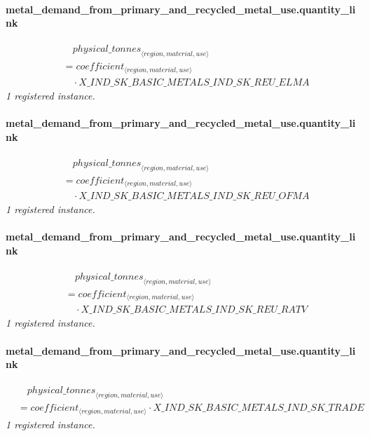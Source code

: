 \documentclass[11pt]{article}
\begin{document}
\paragraph{metal\_demand\_from\_primary\_and\_recycled\_metal\_use.quantity\_link}
\begin{align*}
&\quad {physical\_tonnes}_{\langle region, material, use\rangle}\\
&= coefficient_{\langle region, material, use\rangle}\\
&\quad {}\cdot X\_IND\_SK\_BASIC\_METALS\_IND\_SK\_REU\_ELMA
\end{align*}
\noindent\emph{1 registered instance.}\par
\paragraph{metal\_demand\_from\_primary\_and\_recycled\_metal\_use.quantity\_link}
\begin{align*}
&\quad {physical\_tonnes}_{\langle region, material, use\rangle}\\
&= coefficient_{\langle region, material, use\rangle}\\
&\quad {}\cdot X\_IND\_SK\_BASIC\_METALS\_IND\_SK\_REU\_OFMA
\end{align*}
\noindent\emph{1 registered instance.}\par
\paragraph{metal\_demand\_from\_primary\_and\_recycled\_metal\_use.quantity\_link}
\begin{align*}
&\quad {physical\_tonnes}_{\langle region, material, use\rangle}\\
&= coefficient_{\langle region, material, use\rangle}\\
&\quad {}\cdot X\_IND\_SK\_BASIC\_METALS\_IND\_SK\_REU\_RATV
\end{align*}
\noindent\emph{1 registered instance.}\par
\paragraph{metal\_demand\_from\_primary\_and\_recycled\_metal\_use.quantity\_link}
\begin{align*}
&\quad {physical\_tonnes}_{\langle region, material, use\rangle}\\
&= coefficient_{\langle region, material, use\rangle} \cdot X\_IND\_SK\_BASIC\_METALS\_IND\_SK\_TRADE
\end{align*}
\noindent\emph{1 registered instance.}\par
\end{document}
